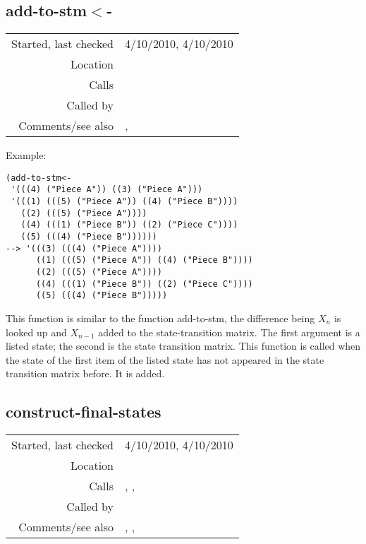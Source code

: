 \subsection*{add-to-stm$<$-}\label{fun:add-to-stm<-}

\vspace{0.3cm}
\begin{tabular}{r|p{8cm}}
Started, last checked & 4/10/2010, 4/10/2010 \\
Location & \nameref{sec:markov-analyse-backwards} \\
Calls & \\
Called by & \nameref{fun:present-to-stm<-} \\
Comments/see also & \nameref{fun:accumulate-to-stm<-}, \nameref{fun:add-to-stm}
\end{tabular}

\vspace{0.5cm}
\noindent Example:
\begin{verbatim}
(add-to-stm<-
 '(((4) ("Piece A")) ((3) ("Piece A")))
 '(((1) (((5) ("Piece A")) ((4) ("Piece B"))))
   ((2) (((5) ("Piece A"))))
   ((4) (((1) ("Piece B")) ((2) ("Piece C"))))
   ((5) (((4) ("Piece B"))))))
--> '(((3) (((4) ("Piece A"))))
      ((1) (((5) ("Piece A")) ((4) ("Piece B"))))
      ((2) (((5) ("Piece A"))))
      ((4) (((1) ("Piece B")) ((2) ("Piece C"))))
      ((5) (((4) ("Piece B")))))
\end{verbatim}

\noindent This function is similar to the function
add-to-stm, the difference being $X_n$ is looked up
and $X_{n-1}$ added to the state-transition matrix.
The first argument is a listed state; the second is
the state transition matrix. This function is called
when the state of the first item of the listed state
has not appeared in the state transition matrix
before. It is added.


\subsection*{construct-final-states}\label{fun:construct-final-states}

\vspace{0.3cm}
\begin{tabular}{r|p{8cm}}
Started, last checked & 4/10/2010, 4/10/2010 \\
Location & \nameref{sec:markov-analyse-backwards} \\
Calls & \nameref{fun:beat-spacing-states}, \nameref{fun:lastn},\newline \nameref{fun:spacing-holding-states} \\
Called by & \\
Comments/see also & \nameref{fun:construct-initial-states}, \nameref{fun:construct-stm},\newline \nameref{fun:construct-stm<-}
\end{tabular}

